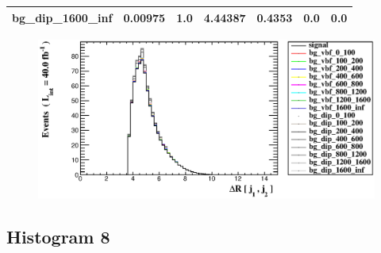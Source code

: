 \documentclass[a4paper, 10pt]{article}
\begin{document}
\begin{table}[H]
\begin{center}
\begin{tabular}{|m{23.0mm}|m{23.0mm}|m{18.0mm}|m{19.0mm}|m{19.0mm}|m{19.0mm}|m{19.0mm}|}
      \hline
      {\cellcolor{white}         bg\_dip\_1600\_inf}& {\cellcolor{white}         0.00975}& {\cellcolor{white}         1.0}& {\cellcolor{white}         4.44387}& {\cellcolor{white}         0.4353}& {\cellcolor{green}         0.0}& {\cellcolor{green}         0.0}\\
\hline
    \end{tabular}
  \end{center}
\end{table}

\begin{figure}[H]
  \begin{center}
    \includegraphics[scale=0.45]{selection_6.eps}\\
\caption{   }
  \end{center}
\end{figure}
      \newpage
\subsection{ Histogram 8}
\end{document}
